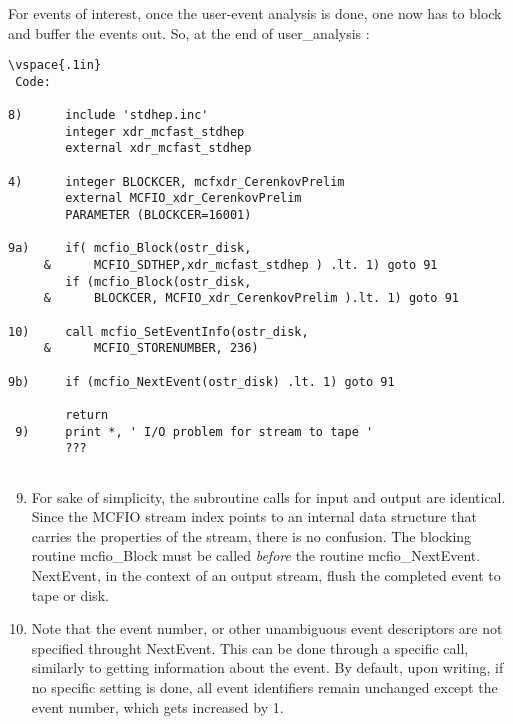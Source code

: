 For events of interest, once the user-event analysis is done, one now has to
block and buffer the events out. So, at the end  of user\_analysis :

\begin{verbatim}
\vspace{.1in} 
 Code:
 
8)      include 'stdhep.inc'
        integer xdr_mcfast_stdhep
        external xdr_mcfast_stdhep
        
4)      integer BLOCKCER, mcfxdr_CerenkovPrelim
        external MCFIO_xdr_CerenkovPrelim
        PARAMETER (BLOCKCER=16001) 	

9a)     if( mcfio_Block(ostr_disk,
     &      MCFIO_SDTHEP,xdr_mcfast_stdhep ) .lt. 1) goto 91	
        if (mcfio_Block(ostr_disk,
     &      BLOCKCER, MCFIO_xdr_CerenkovPrelim ).lt. 1) goto 91

10)     call mcfio_SetEventInfo(ostr_disk,
     &      MCFIO_STORENUMBER, 236)
     
9b)     if (mcfio_NextEvent(ostr_disk) .lt. 1) goto 91

        return
 9)     print *, ' I/O problem for stream to tape '
        ???
        
\end{verbatim}
\vspace{.1in}
\begin{enumerate}
\setcounter{enumi}{8}
\item For sake of simplicity, the subroutine calls for input and output are
identical. Since the MCFIO stream index points to  an internal data structure
that carries the properties of the  stream,  there is no confusion. The
blocking routine mcfio\_Block must be called {\em before}  the  routine
mcfio\_NextEvent.  NextEvent, in the context of an  output stream, flush the
completed event to tape or disk.

\item Note that the event number, or other unambiguous event descriptors are
not specified throught NextEvent.  This can be done through a specific call,
similarly  to getting information about the event. By default, upon writing, if
no specific setting is done, all event identifiers remain unchanged except 
the event number, which gets increased by 1. 

\end{enumerate}

